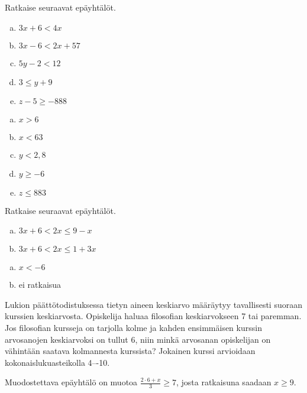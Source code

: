 \begin{tehtava}
    Ratkaise seuraavat epäyhtälöt.
    \begin{enumerate}[a)]
        \item $3x+6<4x$
        \item $3x-6<2x+57$
        \item $5y-2<12$
        \item $3\leq y+9$
        \item $z-5\geq-888$
    \end{enumerate}
    \begin{vastaus}
        \begin{enumerate}[a)]
            \item $x>6$
            \item $x<63$
            \item $y<2,8$
            \item $y\geq -6$
            \item $z\leq 883$
        \end{enumerate}
    \end{vastaus}
\end{tehtava}

\begin{tehtava}
    Ratkaise seuraavat epäyhtälöt.
    \begin{enumerate}[a)]
        \item $3x+6<2x\leq 9-x$
        \item $3x+6<2x\leq 1+3x$
    \end{enumerate}
    \begin{vastaus}
        \begin{enumerate}[a)]
            \item $x<-6$
            \item ei ratkaisua
        \end{enumerate}
    \end{vastaus}
\end{tehtava}

\begin{tehtava}
Lukion päättötodistuksessa tietyn aineen keskiarvo määräytyy tavallisesti suoraan kurssien keskiarvosta. Opiskelija haluaa filosofian keskiarvokseen 7 tai paremman. Jos filosofian kursseja on tarjolla kolme ja kahden ensimmäisen kurssin arvosanojen keskiarvoksi on tullut 6, niin minkä arvosanan opiskelijan on vähintään saatava kolmannesta kurssista? Jokainen kurssi arvioidaan kokonaislukuasteikolla 4–-10.
\begin{vastaus}
Muodostettava epäyhtälö on muotoa $\frac{2\cdot 6+x}{3}\geq 7$, josta ratkaisuna saadaan $x\geq9$.
\end{vastaus}
\end{tehtava}

